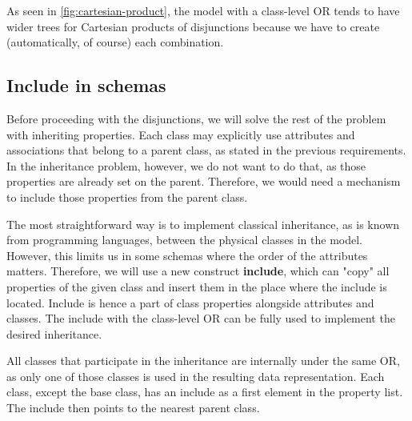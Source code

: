 As seen in \autoref{fig:cartesian-product}, the model with a class-level OR tends to have wider trees for Cartesian products of disjunctions because we have to create (automatically, of course) each combination.

\subsection{Include in schemas}

Before proceeding with the disjunctions, we will solve the rest of the problem with inheriting properties. Each class may explicitly use attributes and associations that belong to a parent class, as stated in the previous requirements. In the inheritance problem, however, we do not want to do that, as those properties are already set on the parent. Therefore, we would need a mechanism to include those properties from the parent class.

The most straightforward way is to implement classical inheritance, as is known from programming languages, between the physical classes in the model. However, this limits us in some schemas where the order of the attributes matters. Therefore, we will use a new construct \textbf{include}, which can "copy" all properties of the given class and insert them in the place where the include is located. Include is hence a part of class properties alongside attributes and classes. The include with the class-level OR can be fully used to implement the desired inheritance.

All classes that participate in the inheritance are internally under the same OR, as only one of those classes is used in the resulting data representation. Each class, except the base class, has an include as a first element in the property list. The include then points to the nearest parent class.

